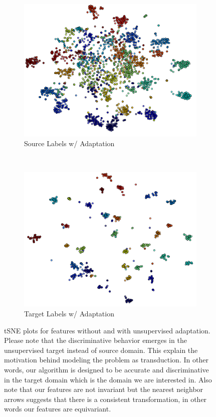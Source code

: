 \begin{figure}[ht]
    \begin{subfigure}[b]{0.5\textwidth}
        \includegraphics[width=\textwidth]{sc.png}
        \caption{Source Labels w/ Adaptation}
        \label{fig:gull}
    \end{subfigure}~\begin{subfigure}[b]{0.5\textwidth}
        \includegraphics[width=\textwidth]{tc.png}
        \caption{Target Labels w/ Adaptation}
        \label{fig:gull}
    \end{subfigure}
\caption{tSNE plots for features without and with unsupervised adaptation. Please note that the discriminative behavior emerges in the unsupervised target instead of source domain. This explain the motivation behind modeling the problem as transduction. In other words, our algorithm is designed to be accurate and discriminative in the target domain which is the domain we are interested in. Also note that our features are not invariant but the nearest neighbor arrows suggests that there is a consistent transformation, in other words our features are equivariant. }
\end{figure}
